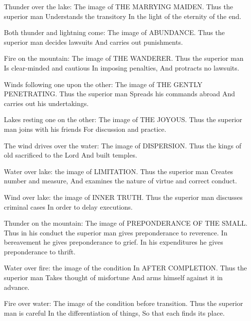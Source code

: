 {Thunder over the lake:
 The image of THE MARRYING MAIDEN.
 Thus the superior man
 Understands the transitory
 In the light of the eternity of the end.}

{Both thunder and lightning come:
 The image of ABUNDANCE.
 Thus the superior man decides lawsuits
 And carries out punishments.}

{Fire on the mountain:
 The image of THE WANDERER.
 Thus the superior man
 Is clear-minded and cautious
 In imposing penalties,
 And protracts no lawsuits.}

{Winds following one upon the other:
 The image of THE GENTLY PENETRATING.
 Thus the superior man
 Spreads his commands abroad
 And carries out his undertakings.}

{Lakes resting one on the other:
 The image of THE JOYOUS.
 Thus the superior man joins with his friends
 For discussion and practice.}

{The wind drives over the water:
 The image of DISPERSION.
 Thus the kings of old sacrificed to the Lord
 And built temples.}

{Water over lake: the image of
 LIMITATION.
 Thus the superior man
 Creates number and measure,
 And examines the nature of virtue and correct conduct.}

{Wind over lake: the image of INNER
 TRUTH.
 Thus the superior man discusses criminal cases
 In order to delay executions.}

{Thunder on the mountain:
 The image of PREPONDERANCE OF THE
 SMALL.
 Thus in his conduct the superior man gives preponderance to reverence.
 In bereavement he gives preponderance to grief.
 In his expenditures he gives preponderance to thrift.}

{Water over fire: the image of the condition
 In AFTER COMPLETION.
 Thus the superior man
 Takes thought of misfortune
 And arms himself against it in advance.}

{Fire over water:
 The image of the condition before transition.
 Thus the superior man is careful
 In the differentiation of things,
 So that each finds its place.}

\endgroup
\begingroup

\def\mk#1#2#3#4#5#6#7{
  \expandafter\gdef\csname hexagram#1/line1/comment\endcsname{#2}
  \expandafter\gdef\csname hexagram#1/line2/comment\endcsname{#3}
  \expandafter\gdef\csname hexagram#1/line3/comment\endcsname{#4}
  \expandafter\gdef\csname hexagram#1/line4/comment\endcsname{#5}
  \expandafter\gdef\csname hexagram#1/line5/comment\endcsname{#6}
  \expandafter\gdef\csname hexagram#1/line6/comment\endcsname{#7}
}

